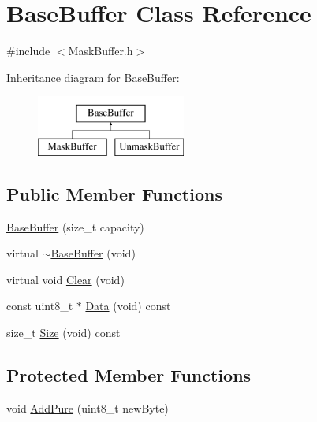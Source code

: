 \hypertarget{class_base_buffer}{\section{Base\-Buffer Class Reference}
\label{class_base_buffer}
}


{\ttfamily \#include $<$Mask\-Buffer.\-h$>$}

Inheritance diagram for Base\-Buffer\-:\begin{figure}[H]
\begin{center}
\leavevmode
\includegraphics[height=2.000000cm]{class_base_buffer}
\end{center}
\end{figure}
\subsection*{Public Member Functions}
\begin{DoxyCompactItemize}
\item 
\hyperlink{class_base_buffer_ad9a224d3a675ca598954a1260625a47f}{Base\-Buffer} (size\-\_\-t capacity)
\item 
virtual \hyperlink{class_base_buffer_a7f90045f192b04e80f0334de445bcb77}{$\sim$\-Base\-Buffer} (void)
\item 
virtual void \hyperlink{class_base_buffer_a783a711936fb71f4e762d20945a5a39a}{Clear} (void)
\item 
const uint8\-\_\-t $\ast$ \hyperlink{class_base_buffer_a203c147ef5f319ab88f1408a65e4e21f}{Data} (void) const 
\item 
size\-\_\-t \hyperlink{class_base_buffer_ac1a14b6abab04b72a87ac7da40c6273d}{Size} (void) const 
\end{DoxyCompactItemize}
\subsection*{Protected Member Functions}
\begin{DoxyCompactItemize}
\item 
void \hyperlink{class_base_buffer_a2d95a62e0b6ac0ab1af89cb7471d20d4}{Add\-Pure} (uint8\-\_\-t new\-Byte)
\end{DoxyCompactItemize}
